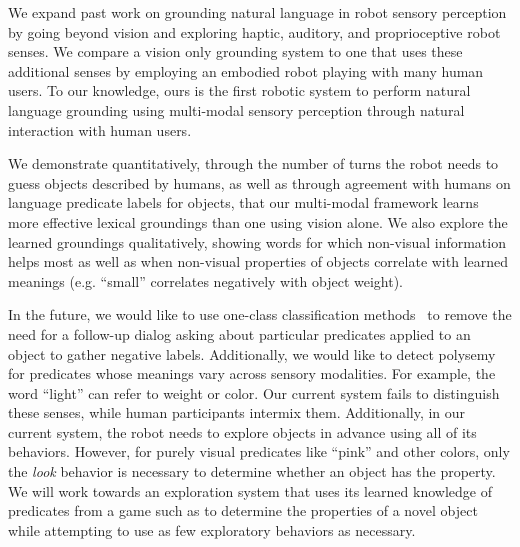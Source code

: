 We expand past work on grounding natural language in robot sensory perception by going beyond vision and exploring haptic, auditory, and proprioceptive robot senses.
We compare a vision only grounding system to one that uses these additional senses by employing an embodied robot playing \ispy with many human users.
To our knowledge, ours is the first robotic system to perform natural language grounding using multi-modal sensory perception through natural interaction with human users.

We demonstrate quantitatively, through the number of turns the robot needs to guess objects described by humans, as well as through agreement with humans on language predicate labels for objects, that our multi-modal framework learns more effective lexical groundings than one using vision alone.
We also explore the learned groundings qualitatively, showing words for which non-visual information helps most as well as when non-visual properties of objects correlate with learned meanings (e.g. ``small'' correlates negatively with object weight).

In the future, we would like to use one-class classification methods~\cite{liu:icdm03} to remove the need for a follow-up dialog asking about particular predicates applied to an object to gather negative labels.
Additionally, we would like to detect polysemy for predicates whose meanings vary across sensory modalities.
For example, the word ``light'' can refer to weight or color.
Our current system fails to distinguish these senses, while human participants intermix them.
Additionally, in our current system, the robot needs to explore objects in advance using all of its behaviors.
However, for purely visual predicates like ``pink'' and other colors, only the {\it look} behavior is necessary to determine whether an object has the property.
We will work towards an exploration system that uses its learned knowledge of predicates from a game such as \ispy to determine the properties of a novel object while attempting to use as few exploratory behaviors as necessary.